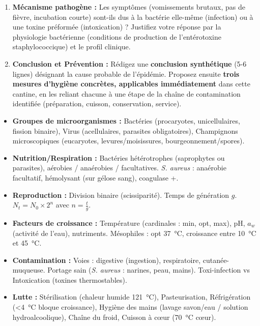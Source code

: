 \documentclass[11pt]{article}
\newcommand{\cle}[1]{{\popxbold\color{popdark}#1}}
\newcounter{popsec}
\newcounter{popsub}
\newcommand{\courssub}[1]{%
  \stepcounter{popsub}%
  \par\vspace{9pt}\noindent{\popxbold\fontsize{11.5}{13}\selectfont\color{popink}{\color{poporange}\thepopsec.\thepopsub}\hspace{6pt}#1}\par\nopagebreak\vspace{4pt}
}
\begin{document}
\begin{enumerate}
    \item \textbf{Mécanisme pathogène :} Les symptômes (vomissements brutaux, pas de fièvre, incubation courte) sont-ils dus à la bactérie elle-même (infection) ou à une \cle{toxine} préformée (intoxication) ? Justifiez votre réponse par la physiologie bactérienne (conditions de production de l'entérotoxine staphylococcique) et le profil clinique.
    
    \item \textbf{Conclusion et Prévention :} Rédigez une \textbf{conclusion synthétique} (5-6 lignes) désignant la cause probable de l'épidémie. Proposez ensuite \textbf{trois mesures d'hygiène concrètes, applicables immédiatement} dans cette cantine, en les reliant chacune à une étape de la chaîne de contamination identifiée (préparation, cuisson, conservation, service).
\end{enumerate}

\courssub{Ressources à mobiliser}
\begin{itemize}
    \item \textbf{Groupes de microorganismes :} Bactéries (procaryotes, unicellulaires, fission binaire), Virus (acellulaires, parasites obligatoires), Champignons microscopiques (eucaryotes, levures/moisissures, bourgeonnement/spores).
    \item \textbf{Nutrition/Respiration :} Bactéries hétérotrophes (saprophytes ou parasites), aérobies / anaérobies / facultatives. \textit{S. aureus} : anaérobie facultatif, hémolysant (sur gélose sang), coagulase +.
    \item \textbf{Reproduction :} Division binaire (scissiparité). Temps de génération $g$. $N_t = N_0 \times 2^n$ avec $n = \frac{t}{g}$.
    \item \textbf{Facteurs de croissance :} Température (cardinales : min, opt, max), pH, $a_w$ (activité de l'eau), nutriments. Mésophiles : opt \SI{37}{\celsius}, croissance entre \SI{10}{\celsius} et \SI{45}{\celsius}.
    \item \textbf{Contamination :} Voies : digestive (ingestion), respiratoire, cutanée-muqueuse. Portage sain (\textit{S. aureus} : narines, peau, mains). Toxi-infection vs Intoxication (toxines thermostables).
    \item \textbf{Lutte :} Stérilisation (chaleur humide \SI{121}{\celsius}), Pasteurisation, Réfrigération (\textless \SI{4}{\celsius} bloque croissance), Hygiène des mains (lavage savon/eau / solution hydroalcoolique), Chaîne du froid, Cuisson à cœur (\SI{70}{\celsius} cœur).
\end{itemize}
\end{document}
